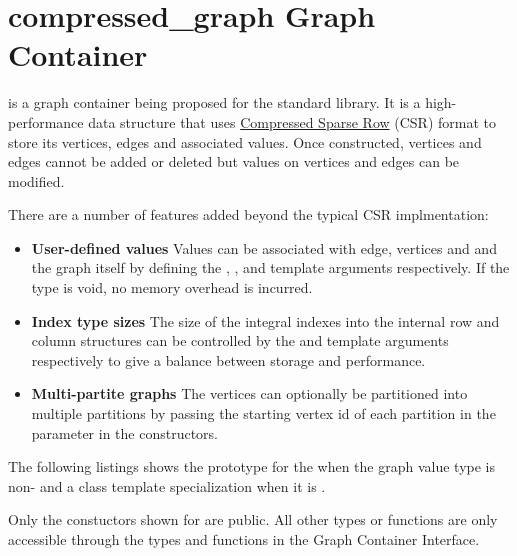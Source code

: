 
\clearpage

\section{compressed\_graph Graph Container}
 is a graph container being proposed for the standard library. It is a high-performance data structure that 
uses \href{https://en.wikipedia.org/wiki/Sparse_matrix#Compressed_sparse_row_\%28CSR\%2C_CRS_or_Yale_format\%29}{Compressed Sparse Row} 
(CSR) format to store its vertices, edges and associated values. Once constructed, vertices and edges cannot be added or deleted 
but values on vertices and edges can be modified.

There are a number of features added beyond the typical CSR implmentation:
\begin{itemize}
    \item   \textbf{User-defined values} Values can be associated with edge, vertices and and the graph itself by defining the 
            , , and  template arguments respectively. If the type is void, no memory overhead is 
            incurred.
    \item   \textbf{Index type sizes} The size of the integral indexes into the internal row and column structures can be controlled
            by the  and  template arguments respectively to give a balance between storage and performance.
    \item   \textbf{Multi-partite graphs} The vertices can optionally be partitioned into multiple partitions by passing the 
            starting vertex id of each partition in the  parameter in the constructors.
\end{itemize}

The following listings shows the prototype for the  when the graph value type  is non- and a 
class template specialization when it is .

Only the constuctors shown for  are public. All other types or functions are only accessible through the types 
and functions in the Graph Container Interface.

